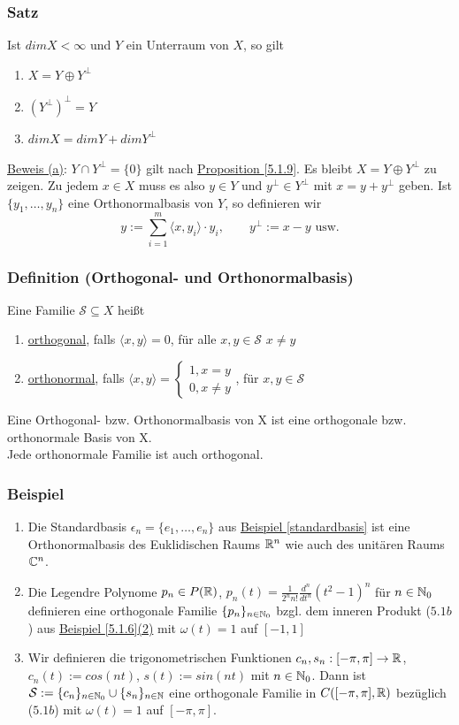 \subsubsection{Satz}
Ist $dimX<\infty$ und $Y$ ein Unterraum von $X$, so gilt
\alphabet
\begin{enumerate}
\item $X=Y\oplus Y^{\bot}$
\item $(Y^{\bot})^{\bot}=Y$
\item $dimX=dimY+dimY^{\bot}$
\end{enumerate}
\underline{Beweis (a)}: $Y\cap Y^{\bot}=\{0\}$ gilt nach \hyperref[5.1.9]{Proposition \ref*{5.1.9}}. Es bleibt $X=Y\oplus Y^{\bot}$ zu zeigen. Zu jedem $x\in X$ muss es also $y\in Y$ und $y^{\bot}\in Y^{\bot}$ mit $x=y+y^{\bot}$ geben. Ist $\{y_1, \dots,y_n\}$ eine Orthonormalbasis von $Y$, so definieren wir
\[y:=\sum_{i=1}^m \langle x,y_i\rangle \cdot y_i,\qquad y^{\bot}:=x-y\text{ usw.}\]
\subsubsection{Definition (Orthogonal- und Orthonormalbasis)}
Eine Familie $\mathcal{S} \subseteq X$ heißt
\alphabet
\begin{enumerate}
\item \underline{orthogonal}, falls $\langle x,y\rangle=0$, für alle $x,y\in \mathcal{S}$ $x\neq y$
\item \underline{orthonormal}, falls $\langle x,y\rangle=\begin{cases}1,x=y\\0,x\neq y\end{cases}$, für $x,y\in \mathcal{S}$
\end{enumerate}
Eine Orthogonal- bzw. Orthonormalbasis von X ist eine orthogonale bzw. orthonormale Basis von X.\\
Jede orthonormale Familie ist auch orthogonal.
\subsubsection{Beispiel}
\label{5.1.12}
\numbers
\begin{enumerate}
\item Die Standardbasis $\epsilon_n=\{e_1,\dots,e_n\}$ aus \hyperref[standardbasis]{Beispiel \ref*{standardbasis}} ist eine Orthonormalbasis des Euklidischen Raums $\mathbb{R}^n$ wie auch des unitären Raums $\mathbb{C}^n$.
\item Die Legendre Polynome $p_n\in P(\mathbb{R})$, $p_n(t)=\frac{1}{2^n n!} \frac{d^n}{dt^n} (t^2-1)^n$ für $n\in\mathbb{N}_0$ definieren eine orthogonale Familie $\{p_n\}_{n\in\mathbb{N}_0}$ bzgl. dem inneren Produkt (\hyperref[5.1b]{$5.1b$}) aus \hyperref[5.1.6]{Beispiel \ref{5.1.6}(2)} mit $\omega(t)=1$ auf $[-1,1]$
\item Wir definieren die trigonometrischen Funktionen $c_n,s_n:[-\pi,\pi]\rightarrow\mathbb{R}$, $c_n(t):=cos(nt)$, $s(t):=sin(nt)$ mit $n\in\mathbb{N}_0$. Dann ist $\mathcal{S}:=\{c_n\}_{n\in\mathbb{N}_0} \cup \{s_n\}_{n\in\mathbb{N}}$ eine orthogonale Familie in $C([-\pi,\pi],\mathbb{R})$ bezüglich (\hyperref[5.1b]{$5.1b$}) mit $\omega(t)=1$ auf $[-\pi,\pi]$.
\end{enumerate}
